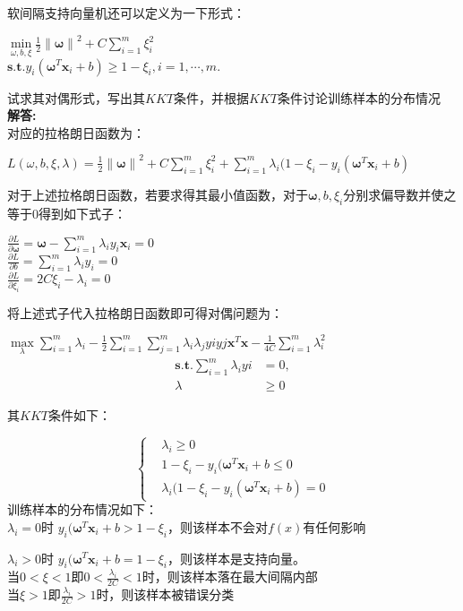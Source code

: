 \documentclass[UTF8]{ctexart}
\begin{document}
\section{}
软间隔支持向量机还可以定义为一下形式：
\begin{center}
$\min \limits_{\omega,b,\xi} \frac{1}{2}\left \| \boldsymbol{\omega} \right \|^2+C\sum_{i=1}^m \xi_{i}^2$\\
$\boldsymbol{s.t.} y_i (\boldsymbol{\omega}^{T}\boldsymbol{x}_i+b)\ge1-\xi_i,i=1,\cdots,m.$
\end{center}
试求其对偶形式，写出其$KKT$条件，并根据$KKT$条件讨论训练样本的分布情况\\
\textbf{解答:}\\
对应的拉格朗日函数为：
\begin{center}
$L(\omega,b,\xi,\lambda)= \frac{1}{2}\left \| \boldsymbol{\omega} \right \|^2+C\sum_{i=1}^m \xi_{i}^2+\sum_{i=1}^m \lambda_i(1-\xi_i-y_i(\boldsymbol{\omega}^{T}\boldsymbol{x}_i+b)$\\
\end{center}
对于上述拉格朗日函数，若要求得其最小值函数，对于$\boldsymbol\omega,b,\xi_i$分别求偏导数并使之等于0得到如下式子：

\begin{center}

$\frac{\partial L}{\partial\boldsymbol\omega}=\boldsymbol\omega-\sum_{i=1}^m \lambda_{i}y_{i}\boldsymbol{x}_i=0$\\
$\frac{\partial L}{\partial b}=\sum_{i=1}^m \lambda_{i}y_{i}=0$\\
$\frac{\partial L}{\partial \xi_i}=2C\xi_i-\lambda_i=0$
\end{center}
将上述式子代入拉格朗日函数即可得对偶问题为：
\begin{center}
$\max \limits_{\lambda}\sum_{i=1}^m \lambda_i-\frac{1}{2}\sum_{i=1}^m \sum_{j=1}^m\lambda_{i}\lambda_{j}y{i}y{j}\boldsymbol{x}^{T}\boldsymbol{x}-\frac{1}{4C}\sum_{i=1}^m \lambda_i^2$
\begin{align}
\boldsymbol{s.t.}  \sum_{i=1}^m \lambda_{i}y{i} & =0,\\
\lambda & \ge0
\end{align}
\end{center}
其$KKT$条件如下：


\begin{equation}
\left\{
\begin{aligned}
&\lambda_i  \ge  0 \\
&1-\xi_i-y_i(\boldsymbol{\omega}^{T}\boldsymbol{x}_i+b \leq  0 \\
&\lambda_i(1-\xi_i-y_i(\boldsymbol{\omega}^{T}\boldsymbol{x}_i+b)  =  0
\end{aligned}
\right.
\end{equation}
训练样本的分布情况如下：\\
{$\lambda_i=0$时}
\noindent$y_i(\boldsymbol{\omega}^{T}\boldsymbol{x}_i+b>1-\xi_i$，则该样本不会对$f(x)$有任何影响

{$\lambda_i>0$时}
\noindent$y_i(\boldsymbol{\omega}^{T}\boldsymbol{x}_i+b=1-\xi_i$，则该样本是支持向量。\\
当$0<\xi<1$即$0<\frac{\lambda_i}{2C}<1$时，则该样本落在最大间隔内部\\
当$\xi>1$即$\frac{\lambda_i}{2C}>1$时，则该样本被错误分类
\end{document}
